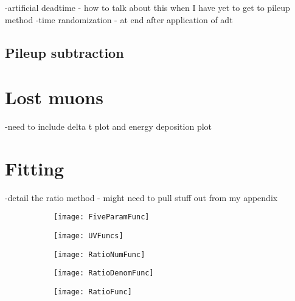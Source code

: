 -artificial deadtime - how to talk about this when I have yet to get to pileup method 
-time randomization - at end after application of adt





\subsection{Pileup subtraction}
\label{sub:pileupsubtraction}






\section{Lost muons}
\label{sec:lostmuons}

-need to include delta t plot and energy deposition plot


\cite{lostmuons}




\section{Fitting}
\label{sec:Fitting}




-detail the ratio method - might need to pull stuff out from my appendix


    \begin{figure}[]
    \centering
        \begin{subfigure}[t]{0.45\textwidth}
            \centering
            \texttt{[image: FiveParamFunc]}
            \caption{}
        \end{subfigure}%

        \vspace{2mm}
        \begin{subfigure}[t]{0.45\textwidth}
            \centering
            \texttt{[image: UVFuncs]}
            \caption{}
        \end{subfigure}
        \begin{subfigure}[t]{0.45\textwidth}
            \centering
            \texttt{[image: RatioNumFunc]}
            \caption{}
        \end{subfigure}%
        \vspace{2mm}
        \begin{subfigure}[t]{0.45\textwidth}
            \centering
            \texttt{[image: RatioDenomFunc]}
            \caption{}
        \end{subfigure}
        \begin{subfigure}[t]{0.45\textwidth}
            \centering
            \texttt{[image: RatioFunc]}
            \caption{}
        \end{subfigure}%
    \caption[]{}
    \label{}
    \end{figure}


